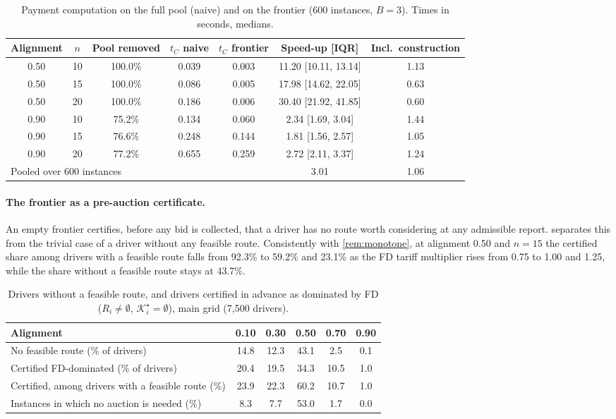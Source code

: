 \documentclass[11pt]{article}
\theoremstyle{definition}
\theoremstyle{remark}
\newcommand{\Ks}{\mathcal{K}^{\star}}
\begin{document}
\begin{table}[!htbp]
\centering
\caption{Payment computation on the full pool (naive) and on the frontier (600 instances, $B=3$). Times in seconds, medians.}
\label{tab:rq4}
\small
\begin{tabular}{ccccccc}
\toprule
Alignment & $n$ & Pool removed & $t_C$ naive & $t_C$ frontier & Speed-up [IQR] & Incl.\ construction\\
\midrule
0.50 & 10 & 100.0\% & 0.039 & 0.003 & 11.20 [10.11, 13.14] & 1.13\\
0.50 & 15 & 100.0\% & 0.086 & 0.005 & 17.98 [14.62, 22.05] & 0.63\\
0.50 & 20 & 100.0\% & 0.186 & 0.006 & 30.40 [21.92, 41.85] & 0.60\\
0.90 & 10 & 75.2\% & 0.134 & 0.060 & 2.34 [1.69, 3.04] & 1.44\\
0.90 & 15 & 76.6\% & 0.248 & 0.144 & 1.81 [1.56, 2.57] & 1.05\\
0.90 & 20 & 77.2\% & 0.655 & 0.259 & 2.72 [2.11, 3.37] & 1.24\\
\midrule
\multicolumn{5}{l}{Pooled over 600 instances} & 3.01 & 1.06\\
\bottomrule
\end{tabular}
\end{table}

\paragraph{The frontier as a pre-auction certificate.} An empty frontier
certifies, before any bid is collected, that a driver has no route worth
considering at any admissible report.  separates this
from the trivial case of a driver without any feasible route. Consistently with
\cref{rem:monotone}, at alignment 0.50 and $n=15$ the certified share among
drivers with a feasible route falls from 92.3\% to 59.2\% and 23.1\% as the FD
tariff multiplier rises from 0.75 to 1.00 and 1.25, while the share without a
feasible route stays at 43.7\%.

\begin{table}[!htbp]
\centering
\caption{Drivers without a feasible route, and drivers certified in advance as dominated by FD ($R_i\ne\emptyset$, $\Ks_i=\emptyset$), main grid (7,500 drivers).}
\label{tab:certificate}
\small
\begin{tabular}{lccccc}
\toprule
Alignment & 0.10 & 0.30 & 0.50 & 0.70 & 0.90\\
\midrule
No feasible route (\% of drivers) & 14.8 & 12.3 & 43.1 & 2.5 & 0.1\\
Certified FD-dominated (\% of drivers) & 20.4 & 19.5 & 34.3 & 10.5 & 1.0\\
Certified, among drivers with a feasible route (\%) & 23.9 & 22.3 & 60.2 & 10.7 & 1.0\\
Instances in which no auction is needed (\%) & 8.3 & 7.7 & 53.0 & 1.7 & 0.0\\
\bottomrule
\end{tabular}
\end{table}
\end{document}
